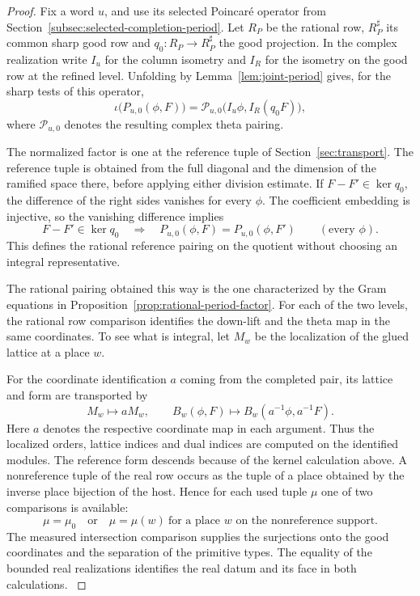 \begin{proof}
Fix a word \(u\), and use its selected Poincar\'e operator from
Section~\ref{subsec:selected-completion-period}. Let \(R_P\) be the
rational row, \(R_P^\sharp\) its common sharp good row and
\(q_0:R_P\to R_P^\sharp\) the good projection. In the complex
realization write \(I_u\) for the column isometry and \(I_R\) for
the isometry on the good row at the refined level. Unfolding by
Lemma~\ref{lem:joint-period} gives, for the sharp tests of this
operator,
\[
 \iota\bigl(P_{u,0}(\phi,F)\bigr)
  =\mathcal P_{u,0}\bigl(I_u\phi, I_R(q_0 F)\bigr),
\]
where \(\mathcal P_{u,0}\) denotes the resulting complex theta
pairing.

The normalized factor is one at the reference tuple
of Section~\ref{sec:transport}. The reference tuple is obtained
from the full diagonal and the dimension of the ramified space
there, before applying either division estimate. If \(F-F'\in\ker q_0\),
the difference of the right sides vanishes for every \(\phi\).
The coefficient embedding is injective, so the vanishing difference implies
\[
 F-F'\in\ker q_0\quad\Longrightarrow\quad P_{u,0}(\phi,F)=P_{u,0}(\phi,F')\qquad(\text{every }\phi).
\] This defines the rational
reference pairing on the quotient without choosing an integral
representative.


The rational pairing obtained this way is the one characterized by
the Gram equations in Proposition~\ref{prop:rational-period-factor}.
For each of the two levels, the rational row comparison identifies
the down-lift and the theta map in the same coordinates. To see what
is integral, let \(M_w\) be the localization of the glued lattice
at a place \(w\).

For the coordinate identification \(a\) coming
from the completed pair, its lattice and form are transported by
\[
 M_w\longmapsto aM_w,\qquad
 B_w(\phi,F)\longmapsto B_w(a^{-1}\phi,a^{-1}F).
\]
Here \(a\) denotes the respective coordinate map in each argument.
Thus the localized orders, lattice indices and dual indices are
computed on the identified modules. The reference form descends
because of the kernel calculation above. A nonreference tuple of
the real row occurs as the tuple of a place obtained by the inverse
place bijection of the host. Hence for each used tuple \(\mu\) one of two comparisons is available:
\[
 \mu=\mu_0\quad\text{or}\quad \mu=\mu(w)\ \text{for a place }w\text{ on the nonreference support}.
\]
The measured intersection comparison supplies the surjections
onto the good coordinates and the separation of the primitive types.
The equality of the bounded real realizations identifies the real
datum and its face in both calculations.
\label{cor:linked-family-rows-1}


\end{proof}
